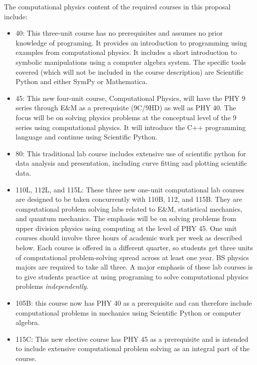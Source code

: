 \documentclass[12pt]{article}
\begin{document}
The computational physics content of the required courses in this
proposal include:
\begin{itemize}
\item 40: This three-unit course has no prerequisites and assumes no
  prior knowledge of programing.  It provides an introduction to
  programming using examples from computational physics.  It includes
  a short introduction to symbolic manipulations using a computer
  algebra system.  The specific tools covered (which will not be
  included in the course description) are Scientific Python and either
  SymPy or Mathematica.

\item 45: This new four-unit course, Computational Physics, will have
  the PHY 9 series through E\&M as a prerequisite (9C/9HD) as well as
  PHY 40.  The focus will be on solving physics problems at the
  conceptual level of the 9 series using computational physics.  It
  will introduce the C++ programming language and continue using
  Scientific Python.
  
\item 80: This traditional lab course includes extensive use of
  scientific python for data analysis and presentation, including
  curve fitting and plotting scientific data.
  
\item 110L, 112L, and 115L: These three new one-unit computational lab
  courses are designed to be taken concurrently with 110B, 112, and
  115B. They are computational problem solving labs related to E\&M,
  statistical mechanics, and quantum mechanics.  The emphasis will be
  on solving problems from upper division physics using computing at
  the level of PHY 45.  One unit courses should involve three hours of
  academic work per week as described below.  Each course is offered
  in a different quarter, so students get three units of computational
  problem-solving spread across at least one year.  BS physics majors are
  required to take all three.  A major emphasis of these lab courses
  is to give students practice at using programing to solve
  computational physics problems {\em independently}.
  
\item 105B: this course now has PHY 40 as a prerequisite and can
  therefore include computational problems in mechanics using
  Scientific Python or computer algebra.

\item 115C: This new elective course has PHY 45 as a prerequisite and
  is intended to include extensive computational problem solving as an
  integral part of the course.
  
\end{itemize}
\end{document}
